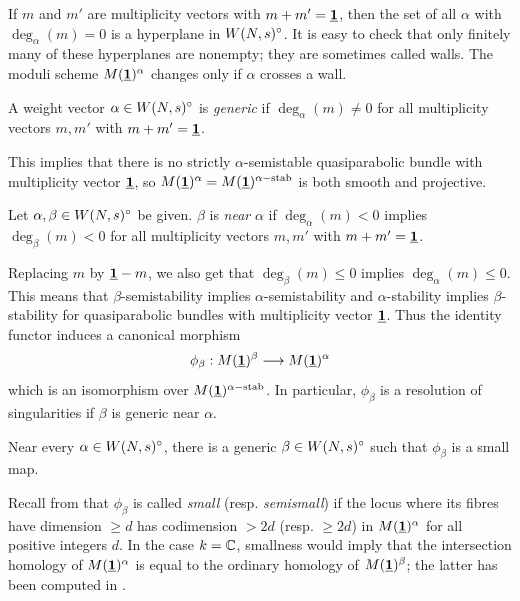 \documentclass{article}
\begin{document}
If $m$ and $m'$ are multiplicity vectors with $m + m' = \underline{\mathbf{1}}$, then the set of all $\alpha$ with $\deg_{\alpha}(m) = 0$ is a hyperplane in $W(N, s)^{\circ}$.
It is easy to check that only finitely many of these hyperplanes are nonempty; they are sometimes called walls. The moduli scheme $M(\underline{\mathbf{1}})^{\alpha}$
changes only if $\alpha$ crosses a wall.

\begin{defn}
  A weight vector $\alpha \in W(N, s)^{\circ}$ is \emph{generic} if $\deg_{\alpha}(m) \neq 0$ for all multiplicity vectors $m, m'$ with $m + m' = \underline{\mathbf{1}}$.
\end{defn}
This implies that there is no strictly $\alpha$-semistable quasiparabolic bundle with multiplicity vector $\underline{\mathbf{1}}$, so
$M(\underline{\mathbf{1}})^{\alpha} = M(\underline{\mathbf{1}})^{\alpha-\mathrm{stab}}$ is both smooth and projective.

\begin{defn}
  Let $\alpha, \beta \in W(N, s)^{\circ}$ be given. $\beta$ is \emph{near} $\alpha$ if $\deg_{\alpha}(m) < 0$ implies $\deg_{\beta}(m) < 0$ for all
  multiplicity vectors $m, m'$ with $m + m' = \underline{\mathbf{1}}$.
\end{defn}
Replacing $m$ by $\underline{\mathbf{1}} - m$, we also get that $\deg_{\beta}(m) \leq 0$ implies $\deg_{\alpha}(m) \leq 0$. This means that $\beta$-semistability implies
$\alpha$-semistability and $\alpha$-stability implies $\beta$-stability for quasiparabolic bundles with multiplicity vector $\underline{\mathbf{1}}$. Thus the identity
functor induces a canonical morphism
\begin{displaymath}
  \phi_{\beta}: M(\underline{\mathbf{1}})^{\beta} \stackrel{}{\longrightarrow} M(\underline{\mathbf{1}})^{\alpha}
\end{displaymath}
which is an isomorphism over $M(\underline{\mathbf{1}})^{\alpha-\mathrm{stab}}$. In particular, $\phi_{\beta}$ is a resolution of singularities if $\beta$ is generic near $\alpha$.

\begin{conj}[Boden--Hu]
  Near every $\alpha \in W(N, s)^{\circ}$, there is a generic $\beta \in W(N, s)^{\circ}$ such that $\phi_{\beta}$ is a small map.
\end{conj}

Recall from \cite{goresky} that $\phi_{\beta}$ is called \emph{small} (resp. \emph{semismall}) if the locus where its fibres have dimension $\geq d$ has
codimension $> 2d$ (resp. $\geq 2d$) in $M(\underline{\mathbf{1}})^{\alpha}$ for all positive integers $d$. In the case $k = \mathbb{C}$, smallness would imply that
the intersection homology of $M(\underline{\mathbf{1}})^{\alpha}$ is equal to the ordinary homology of $M(\underline{\mathbf{1}})^{\beta}$; the latter has been computed in \cite{holla}.
\end{document}
